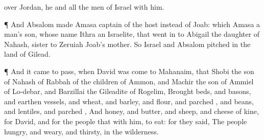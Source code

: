 {over
Jordan, he and all the
men of
Israel with him.
\par }{\PP {}¶ And
Absalom
made
Amasa captain of the
host instead of
Joab: which
Amasa
{} a
man’s
son, whose
name
{}
Ithra an
Israelite, that went
in to
Abigail the
daughter of
Nahash,
sister to
Zeruiah
Joab’s
mother.
So
Israel and
Absalom
pitched in the
land of
Gilead.
\par }{\PP {}¶ And it came to pass, when
David was
come to
Mahanaim, that
Shobi the
son of
Nahash of
Rabbah of the
children of
Ammon, and
Machir the
son of
Ammiel of
Lo-debar, and
Barzillai the
Gileadite of
Rogelim,
Brought
beds, and
basons, and
earthen
vessels, and
wheat, and
barley, and
flour, and
parched
{}, and
beans, and
lentiles, and
parched
{},
And
honey, and
butter, and
sheep, and
cheese of
kine, for
David, and for the
people that
{} with him, to
eat: for they
said, The
people
{}
hungry, and
weary, and
thirsty, in the
wilderness.

}
